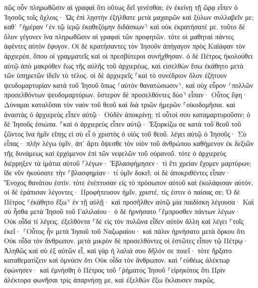 \documentclass[twoside, 9pt]{extreport}
\begin{document}
πῶς οὖν πληρωθῶσιν αἱ γραφαὶ ὅτι οὕτως δεῖ γενέσθαι; 
ἐν ἐκείνῃ τῇ ὥρᾳ εἶπεν ὁ Ἰησοῦς τοῖς ὄχλοις· Ὡς ἐπὶ λῃστὴν ἐξήλθατε μετὰ μαχαιρῶν καὶ ξύλων συλλαβεῖν με; καθ᾽ ⸀ἡμέραν ⸂ἐν τῷ ἱερῷ ἐκαθεζόμην διδάσκων⸃ καὶ οὐκ ἐκρατήσατέ με. 
τοῦτο δὲ ὅλον γέγονεν ἵνα πληρωθῶσιν αἱ γραφαὶ τῶν προφητῶν. τότε οἱ μαθηταὶ πάντες ἀφέντες αὐτὸν ἔφυγον. 
Οἱ δὲ κρατήσαντες τὸν Ἰησοῦν ἀπήγαγον πρὸς Καϊάφαν τὸν ἀρχιερέα, ὅπου οἱ γραμματεῖς καὶ οἱ πρεσβύτεροι συνήχθησαν. 
ὁ δὲ Πέτρος ἠκολούθει αὐτῷ ἀπὸ μακρόθεν ἕως τῆς αὐλῆς τοῦ ἀρχιερέως, καὶ εἰσελθὼν ἔσω ἐκάθητο μετὰ τῶν ὑπηρετῶν ἰδεῖν τὸ τέλος. 
οἱ δὲ ἀρχιερεῖς ⸀καὶ τὸ συνέδριον ὅλον ἐζήτουν ψευδομαρτυρίαν κατὰ τοῦ Ἰησοῦ ὅπως ⸂αὐτὸν θανατώσωσιν⸃, 
καὶ οὐχ εὗρον ⸂πολλῶν προσελθόντων ψευδομαρτύρων. ὕστερον δὲ προσελθόντες δύο⸃ 
εἶπαν· Οὗτος ἔφη· Δύναμαι καταλῦσαι τὸν ναὸν τοῦ θεοῦ καὶ διὰ τριῶν ἡμερῶν ⸀οἰκοδομῆσαι. 
καὶ ἀναστὰς ὁ ἀρχιερεὺς εἶπεν αὐτῷ· Οὐδὲν ἀποκρίνῃ; τί οὗτοί σου καταμαρτυροῦσιν; 
ὁ δὲ Ἰησοῦς ἐσιώπα. ⸀καὶ ὁ ἀρχιερεὺς εἶπεν αὐτῷ· Ἐξορκίζω σε κατὰ τοῦ θεοῦ τοῦ ζῶντος ἵνα ἡμῖν εἴπῃς εἰ σὺ εἶ ὁ χριστὸς ὁ υἱὸς τοῦ θεοῦ. 
λέγει αὐτῷ ὁ Ἰησοῦς· Σὺ εἶπας· πλὴν λέγω ὑμῖν, ἀπ᾽ ἄρτι ὄψεσθε τὸν υἱὸν τοῦ ἀνθρώπου καθήμενον ἐκ δεξιῶν τῆς δυνάμεως καὶ ἐρχόμενον ἐπὶ τῶν νεφελῶν τοῦ οὐρανοῦ. 
τότε ὁ ἀρχιερεὺς διέρρηξεν τὰ ἱμάτια αὐτοῦ ⸀λέγων· Ἐβλασφήμησεν· τί ἔτι χρείαν ἔχομεν μαρτύρων; ἴδε νῦν ἠκούσατε τὴν ⸀βλασφημίαν· 
τί ὑμῖν δοκεῖ; οἱ δὲ ἀποκριθέντες εἶπαν· Ἔνοχος θανάτου ἐστίν. 
τότε ἐνέπτυσαν εἰς τὸ πρόσωπον αὐτοῦ καὶ ἐκολάφισαν αὐτόν, οἱ δὲ ἐράπισαν 
λέγοντες· Προφήτευσον ἡμῖν, χριστέ, τίς ἐστιν ὁ παίσας σε; 
Ὁ δὲ Πέτρος ⸂ἐκάθητο ἔξω⸃ ἐν τῇ αὐλῇ· καὶ προσῆλθεν αὐτῷ μία παιδίσκη λέγουσα· Καὶ σὺ ἦσθα μετὰ Ἰησοῦ τοῦ Γαλιλαίου· 
ὁ δὲ ἠρνήσατο ⸀ἔμπροσθεν πάντων λέγων· Οὐκ οἶδα τί λέγεις. 
ἐξελθόντα ⸀δὲ εἰς τὸν πυλῶνα εἶδεν αὐτὸν ἄλλη καὶ λέγει ⸀τοῖς ἐκεῖ· ⸀Οὗτος ἦν μετὰ Ἰησοῦ τοῦ Ναζωραίου· 
καὶ πάλιν ἠρνήσατο μετὰ ὅρκου ὅτι Οὐκ οἶδα τὸν ἄνθρωπον. 
μετὰ μικρὸν δὲ προσελθόντες οἱ ἑστῶτες εἶπον τῷ Πέτρῳ· Ἀληθῶς καὶ σὺ ἐξ αὐτῶν εἶ, καὶ γὰρ ἡ λαλιά σου δῆλόν σε ποιεῖ· 
τότε ἤρξατο καταθεματίζειν καὶ ὀμνύειν ὅτι Οὐκ οἶδα τὸν ἄνθρωπον. καὶ ⸀εὐθέως ἀλέκτωρ ἐφώνησεν· 
καὶ ἐμνήσθη ὁ Πέτρος τοῦ ⸀ῥήματος Ἰησοῦ ⸀εἰρηκότος ὅτι Πρὶν ἀλέκτορα φωνῆσαι τρὶς ἀπαρνήσῃ με, καὶ ἐξελθὼν ἔξω ἔκλαυσεν πικρῶς. 
\end{document}
